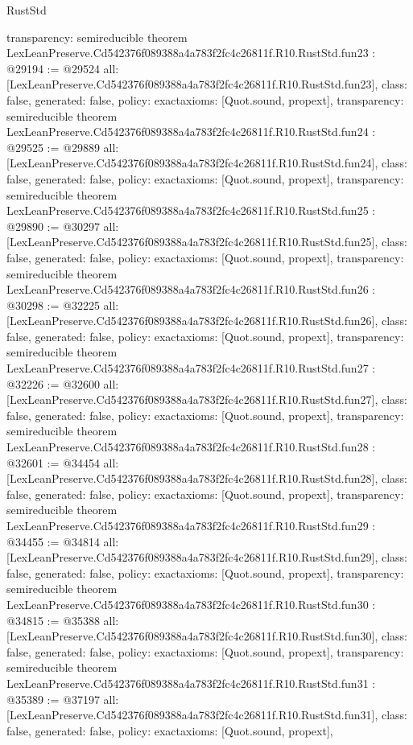 \begin{lexlean}{RustStd}
\begin{coremodule}
{  transparency: semireducible
}
theorem LexLeanPreserve.Cd542376f089388a4a783f2fc4c26811f.R10.RustStd.fun23 : @29194 := @29524 {
  all: [LexLeanPreserve.Cd542376f089388a4a783f2fc4c26811f.R10.RustStd.fun23],
  class: false,
  generated: false,
  policy: exact{axioms: [Quot.sound, propext]},
  transparency: semireducible
}
theorem LexLeanPreserve.Cd542376f089388a4a783f2fc4c26811f.R10.RustStd.fun24 : @29525 := @29889 {
  all: [LexLeanPreserve.Cd542376f089388a4a783f2fc4c26811f.R10.RustStd.fun24],
  class: false,
  generated: false,
  policy: exact{axioms: [Quot.sound, propext]},
  transparency: semireducible
}
theorem LexLeanPreserve.Cd542376f089388a4a783f2fc4c26811f.R10.RustStd.fun25 : @29890 := @30297 {
  all: [LexLeanPreserve.Cd542376f089388a4a783f2fc4c26811f.R10.RustStd.fun25],
  class: false,
  generated: false,
  policy: exact{axioms: [Quot.sound, propext]},
  transparency: semireducible
}
theorem LexLeanPreserve.Cd542376f089388a4a783f2fc4c26811f.R10.RustStd.fun26 : @30298 := @32225 {
  all: [LexLeanPreserve.Cd542376f089388a4a783f2fc4c26811f.R10.RustStd.fun26],
  class: false,
  generated: false,
  policy: exact{axioms: [Quot.sound, propext]},
  transparency: semireducible
}
theorem LexLeanPreserve.Cd542376f089388a4a783f2fc4c26811f.R10.RustStd.fun27 : @32226 := @32600 {
  all: [LexLeanPreserve.Cd542376f089388a4a783f2fc4c26811f.R10.RustStd.fun27],
  class: false,
  generated: false,
  policy: exact{axioms: [Quot.sound, propext]},
  transparency: semireducible
}
theorem LexLeanPreserve.Cd542376f089388a4a783f2fc4c26811f.R10.RustStd.fun28 : @32601 := @34454 {
  all: [LexLeanPreserve.Cd542376f089388a4a783f2fc4c26811f.R10.RustStd.fun28],
  class: false,
  generated: false,
  policy: exact{axioms: [Quot.sound, propext]},
  transparency: semireducible
}
theorem LexLeanPreserve.Cd542376f089388a4a783f2fc4c26811f.R10.RustStd.fun29 : @34455 := @34814 {
  all: [LexLeanPreserve.Cd542376f089388a4a783f2fc4c26811f.R10.RustStd.fun29],
  class: false,
  generated: false,
  policy: exact{axioms: [Quot.sound, propext]},
  transparency: semireducible
}
theorem LexLeanPreserve.Cd542376f089388a4a783f2fc4c26811f.R10.RustStd.fun30 : @34815 := @35388 {
  all: [LexLeanPreserve.Cd542376f089388a4a783f2fc4c26811f.R10.RustStd.fun30],
  class: false,
  generated: false,
  policy: exact{axioms: [Quot.sound, propext]},
  transparency: semireducible
}
theorem LexLeanPreserve.Cd542376f089388a4a783f2fc4c26811f.R10.RustStd.fun31 : @35389 := @37197 {
  all: [LexLeanPreserve.Cd542376f089388a4a783f2fc4c26811f.R10.RustStd.fun31],
  class: false,
  generated: false,
  policy: exact{axioms: [Quot.sound, propext]},
}
\end{coremodule}
\end{lexlean}
